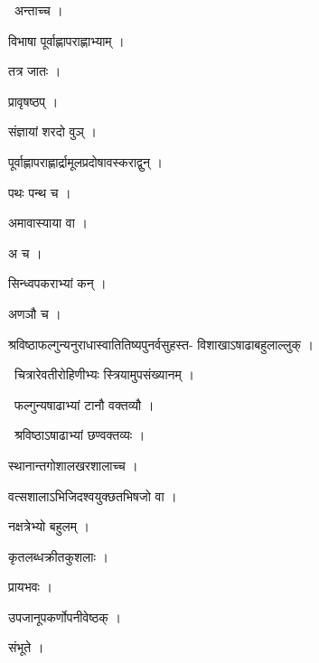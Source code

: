 \documentclass[10pt, openany, oneside]{book}
\begin{document}
\par\noindent\hspace{1.5em}{\vps वा॰}~{\qt अन्ताच्च ।}

\noindent विभाषा पूर्वाह्णापराह्णाभ्याम् ।

\noindent तत्र जातः ।

\noindent प्रावृषष्ठप् ।

\noindent संज्ञायां शरदो वुञ् ।

\noindent पूर्वाह्णापराह्णार्द्रामूलप्रदोषावस्कराद्वुन् ।

\noindent पथः पन्थ च ।

\noindent अमावास्याया वा ।

\noindent अ च ।

\noindent सिन्ध्वपकराभ्यां कन् ।

\noindent अणञौ च ।

\noindent श्रविष्ठाफल्गुन्यनुराधास्वातितिष्यपुनर्वसुहस्त- विशाखाऽषाढाबहुलाल्लुक् ।

\par\noindent\hspace{1.5em}{\vps वा॰}~{\qt चित्रारेवतीरोहिणीभ्यः स्त्रियामुपसंख्यानम् ।}

\par\noindent\hspace{1.5em}{\vps वा॰}~{\qt फल्गुन्यषाढाभ्यां टानौ वक्तव्यौ ।}

\par\noindent\hspace{1.5em}{\vps वा॰}~{\qt श्रविष्ठाऽषाढाभ्यां छण्वक्तव्यः ।}

\noindent स्थानान्तगोशालखरशालाच्च ।

\noindent वत्सशालाऽभिजिदश्वयुक्छतभिषजो वा ।

\noindent नक्षत्रेभ्यो बहुलम् ।

\noindent कृतलब्धक्रीतकुशलाः ।

\noindent प्रायभवः ।

\noindent उपजानूपकर्णोपनीवेष्ठक् ।

\noindent संभूते ।
\end{document}
